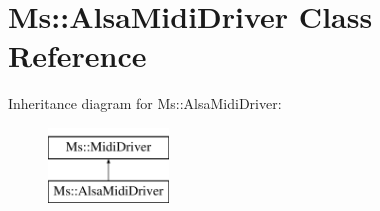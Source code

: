 \hypertarget{class_ms_1_1_alsa_midi_driver}{}\section{Ms\+:\+:Alsa\+Midi\+Driver Class Reference}
\label{class_ms_1_1_alsa_midi_driver}
Inheritance diagram for Ms\+:\+:Alsa\+Midi\+Driver\+:\begin{figure}[H]
\begin{center}
\leavevmode
\includegraphics[height=2.000000cm]{class_ms_1_1_alsa_midi_driver}
\end{center}
\end{figure}

